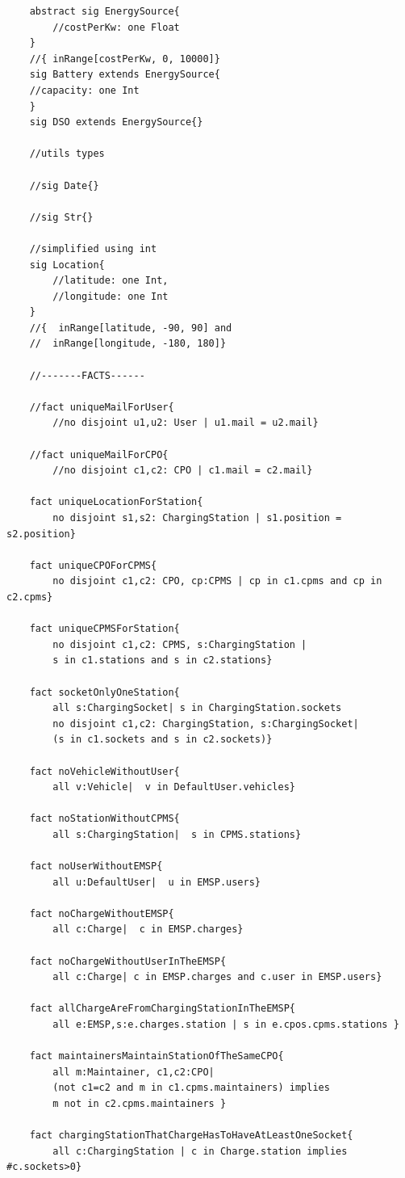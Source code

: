 \begin{verbatim}
    abstract sig EnergySource{
        //costPerKw: one Float
    }
    //{ inRange[costPerKw, 0, 10000]}
    sig Battery extends EnergySource{
    //capacity: one Int
    }
    sig DSO extends EnergySource{}
    
    //utils types
    
    //sig Date{}
    
    //sig Str{}
    
    //simplified using int
    sig Location{  
        //latitude: one Int,   
        //longitude: one Int
    }
    //{  inRange[latitude, -90, 90] and   
    //	inRange[longitude, -180, 180]}
    
    //-------FACTS------
    
    //fact uniqueMailForUser{
        //no disjoint u1,u2: User | u1.mail = u2.mail}
    
    //fact uniqueMailForCPO{
        //no disjoint c1,c2: CPO | c1.mail = c2.mail}
    
    fact uniqueLocationForStation{
        no disjoint s1,s2: ChargingStation | s1.position = s2.position}
    
    fact uniqueCPOForCPMS{
        no disjoint c1,c2: CPO, cp:CPMS | cp in c1.cpms and cp in c2.cpms}
    
    fact uniqueCPMSForStation{
        no disjoint c1,c2: CPMS, s:ChargingStation | 
        s in c1.stations and s in c2.stations}
    
    fact socketOnlyOneStation{
        all s:ChargingSocket| s in ChargingStation.sockets
        no disjoint c1,c2: ChargingStation, s:ChargingSocket|
        (s in c1.sockets and s in c2.sockets)}
    
    fact noVehicleWithoutUser{
        all v:Vehicle|  v in DefaultUser.vehicles}
    
    fact noStationWithoutCPMS{
        all s:ChargingStation|  s in CPMS.stations}
    
    fact noUserWithoutEMSP{
        all u:DefaultUser|  u in EMSP.users}
    
    fact noChargeWithoutEMSP{
        all c:Charge|  c in EMSP.charges} 
    
    fact noChargeWithoutUserInTheEMSP{
        all c:Charge| c in EMSP.charges and c.user in EMSP.users}
    
    fact allChargeAreFromChargingStationInTheEMSP{
        all e:EMSP,s:e.charges.station | s in e.cpos.cpms.stations }
    
    fact maintainersMaintainStationOfTheSameCPO{
        all m:Maintainer, c1,c2:CPO|
        (not c1=c2 and m in c1.cpms.maintainers) implies 
        m not in c2.cpms.maintainers }
    
    fact chargingStationThatChargeHasToHaveAtLeastOneSocket{
        all c:ChargingStation | c in Charge.station implies #c.sockets>0}
        
\end{verbatim}

